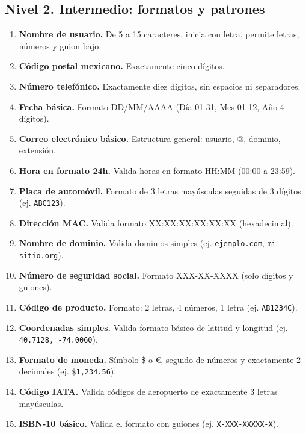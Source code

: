 \documentclass[12pt]{article}
\newcommand{\espacioalumno}{%
  \begin{flushleft}
  \vspace{5cm}
  \end{flushleft}
}
\begin{document}
{\subsection{Nivel 2. Intermedio: formatos y patrones}
\begin{enumerate}[label=\textbf{Ejercicio \arabic*.}, start=16]
\item \textbf{Nombre de usuario.} De 5 a 15 caracteres, inicia con letra, permite letras, números y guion bajo.
  \vspace{4.5cm}
\item \textbf{Código postal mexicano.} Exactamente cinco dígitos.
  \vspace{4.5cm}
\item \textbf{Número telefónico.} Exactamente diez dígitos, sin espacios ni separadores.
  \vspace{4.5cm}
\item \textbf{Fecha básica.} Formato DD/MM/AAAA (Día 01-31, Mes 01-12, Año 4 dígitos).
  \vspace{4.5cm}
\item \textbf{Correo electrónico básico.} Estructura general: usuario, @, dominio, extensión.
  \vspace{4.5cm}
\item \textbf{Hora en formato 24h.} Valida horas en formato HH:MM (00:00 a 23:59).
  \vspace{4.5cm}
\item \textbf{Placa de automóvil.} Formato de 3 letras mayúsculas seguidas de 3 dígitos (ej. \texttt{ABC123}).
\espacioalumno
\item \textbf{Dirección MAC.} Valida formato XX:XX:XX:XX:XX:XX (hexadecimal).
\espacioalumno
\item \textbf{Nombre de dominio.} Valida dominios simples (ej. \texttt{ejemplo.com}, \texttt{mi-sitio.org}).
\espacioalumno
\item \textbf{Número de seguridad social.} Formato XXX-XX-XXXX (solo dígitos y guiones).
  \vspace{4.5cm}
\item \textbf{Código de producto.} Formato: 2 letras, 4 números, 1 letra (ej. \texttt{AB1234C}).
  \vspace{4.5cm}
\item \textbf{Coordenadas simples.} Valida formato básico de latitud y longitud (ej. \texttt{40.7128, -74.0060}).
  \vspace{4.5cm}
\item \textbf{Formato de moneda.} Símbolo \$ o €, seguido de números y exactamente 2 decimales (ej. \texttt{\$1,234.56}).
  \vspace{4.5cm}
\item \textbf{Código IATA.} Valida códigos de aeropuerto de exactamente 3 letras mayúsculas.
  \vspace{4.5cm}
\item \textbf{ISBN-10 básico.} Valida el formato con guiones (ej. \texttt{X-XXX-XXXXX-X}).
  \vspace{4.5cm}
\end{enumerate}

}
\end{document}

